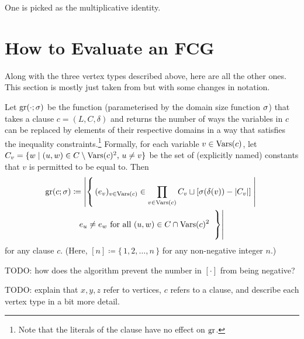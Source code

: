 One is picked as the multiplicative identity.

\section{How to Evaluate an FCG} \label{sec:evaluation}

Along with the three vertex types described above, here are all the other ones. This section is mostly just taken from \citep{DBLP:conf/ijcai/BroeckTMDR11} but with some changes in notation.

\begin{definition}
  Let $\operatorname{gr}(\cdot; \sigma)$ be the function (parameterised by the domain size function $\operatorname{\sigma}$) that takes a clause $c = (L, C, \delta)$ and returns the number of ways the variables in $c$ can be replaced by elements of their respective domains in a way that satisfies the inequality constraints.\footnote{Note that the literals of the clause have no effect on $\operatorname{gr}$.} Formally, for each variable $v \in \operatorname{Vars}(c)$, let $C_v = \{ w \mid (u, w) \in C \setminus \operatorname{Vars}(c)^2 \text{, }u \ne v \}$ be the set of (explicitly named) constants that $v$ is permitted to be equal to. Then
  \begin{multline*}
    \gr(c; \sigma) \coloneqq \left|\left\{\, (e_v)_{v \in \Vars(c)} \in \prod_{v \in \Vars(c)} C_v \sqcup [\sigma(\delta(v)) - |C_v|] \;\middle| \right.\right. \\
    e_u \ne e_w \text{ for all } (u, w) \in C \cap \Vars(c)^2 \left.\left. \vphantom{\prod_{v \in \Vars(c)}} \,\right\}\right|
  \end{multline*}
  for any clause $c$. (Here, $[n] \coloneqq \{\,1, 2, \dots, n\,\}$ for any non-negative integer $n$.)
\end{definition}

TODO: how does the algorithm prevent the number in $[\cdot]$ from being negative?

TODO: explain that $x, y, z$ refer to vertices, $c$ refers to a clause, and describe each vertex type in a bit more detail.

